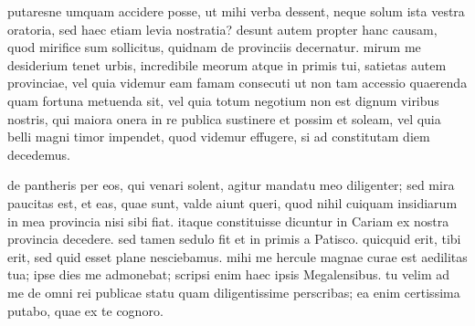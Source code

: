 


 putaresne umquam accidere posse, ut mihi verba dessent, neque solum ista vestra oratoria, sed haec etiam levia nostratia? desunt autem propter hanc causam, quod mirifice sum sollicitus, quidnam de provinciis decernatur. mirum me desiderium tenet urbis, incredibile meorum atque in primis tui, satietas autem provinciae, vel quia videmur eam famam consecuti ut non tam accessio quaerenda quam fortuna metuenda sit, vel quia totum negotium non est dignum viribus nostris, qui maiora onera in re publica sustinere et possim et soleam, vel quia belli magni timor impendet, quod videmur effugere, si ad constitutam diem decedemus.

 de pantheris per eos, qui venari solent, agitur mandatu meo diligenter; sed mira paucitas est, et eas, quae sunt, valde aiunt queri, quod nihil cuiquam insidiarum in mea provincia nisi sibi fiat. itaque constituisse dicuntur in Cariam ex nostra provincia decedere. sed tamen sedulo fit et in primis a Patisco. quicquid erit, tibi erit, sed quid esset plane nesciebamus. mihi me hercule magnae curae est aedilitas tua; ipse dies me admonebat; scripsi enim haec ipsis Megalensibus. tu velim ad me de omni rei publicae statu quam diligentissime perscribas; ea enim certissima putabo, quae ex te cognoro.
